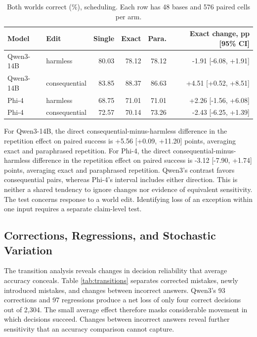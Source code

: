 \documentclass{svproc}
\begin{document}
\begin{table}[htbp]
\centering\small
\setlength{\tabcolsep}{4pt}
\caption{Both worlds correct (\%), scheduling. Each row has 48 bases and 576 paired cells per arm.}\label{tab:paired}
\begin{tabular}{llrrrr}\toprule
Model & Edit & Single & Exact & Para. & Exact change, pp [95\% CI]\\\midrule
Qwen3-14B & harmless & 80.03 & 78.12 & 78.12 & -1.91 [-6.08, +1.91]\\
Qwen3-14B & consequential & 83.85 & 88.37 & 86.63 & +4.51 [+0.52, +8.51]\\
Phi-4 & harmless & 68.75 & 71.01 & 71.01 & +2.26 [-1.56, +6.08]\\
Phi-4 & consequential & 72.57 & 70.14 & 73.26 & -2.43 [-6.25, +1.39]\\
\bottomrule\end{tabular}
\end{table}

For Qwen3-14B, the direct consequential-minus-harmless difference in the repetition effect on paired success is +5.56 [+0.09, +11.20] points, averaging exact and paraphrased repetition. For Phi-4, the direct consequential-minus-harmless difference in the repetition effect on paired success is -3.12 [-7.90, +1.74] points, averaging exact and paraphrased repetition.
Qwen3's contrast favors consequential pairs, whereas Phi-4's interval includes
either direction. This is neither a shared tendency to ignore changes nor evidence
of equivalent sensitivity. The test concerns response to a world edit. Identifying
loss of an exception within one input requires a separate claim-level test.


\subsection{Corrections, Regressions, and Stochastic Variation}
The transition analysis reveals changes in decision reliability that average
accuracy conceals. Table \ref{tab:transitions} separates corrected mistakes,
newly introduced mistakes, and changes between incorrect answers. Qwen3's
93 corrections and 97 regressions produce a net loss of only four correct
decisions out of 2,304. The small average effect therefore masks considerable
movement in which decisions succeed. Changes between incorrect answers reveal
further sensitivity that an accuracy comparison cannot capture.
\end{document}
